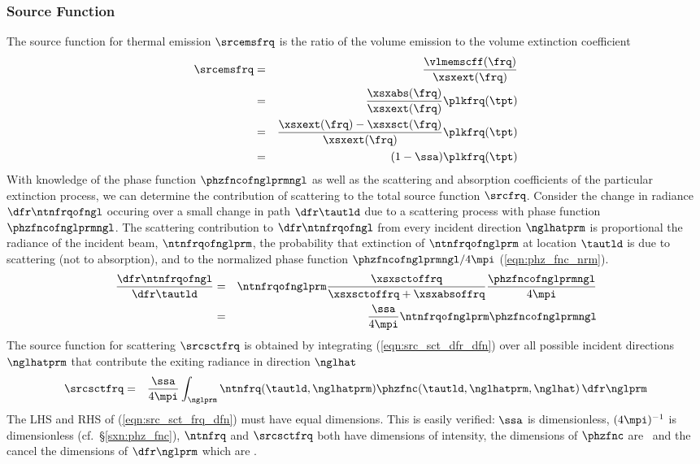 \documentclass[12pt]{article}
\begin{document}
\subsubsection[Source Function]{Source Function}\label{sxn:src_slb}
The source function for thermal emission $\srcemsfrq$ is the ratio of the 
volume emission to the volume extinction coefficient
\begin{eqnarray}
\srcemsfrq & = & \frac{\vlmemscff(\frq)}{\xsxext(\frq)} \nonumber \\
& = & \frac{\xsxabs(\frq)}{\xsxext(\frq)}\plkfrq(\tpt) \nonumber \\
& = & \frac{\xsxext(\frq)-\xsxsct(\frq)}{\xsxext(\frq)}\plkfrq(\tpt) \nonumber \\
& = & (1-\ssa)\plkfrq(\tpt)
\label{eqn:src_ems_frq_dfn}
\end{eqnarray}
With knowledge of the phase function $\phzfncofnglprmngl$ as well as
the scattering and absorption coefficients of the particular
extinction process, we can determine the contribution of scattering
to the total source function $\srcfrq$.
Consider the change in radiance $\dfr\ntnfrqofngl$ occuring over a
small change in path $\dfr\tautld$ due to a scattering process with
phase function $\phzfncofnglprmngl$.
The scattering contribution to $\dfr\ntnfrqofngl$ from every incident 
direction $\nglhatprm$ is proportional the radiance of the incident
beam, $\ntnfrqofnglprm$, the probability that extinction of
$\ntnfrqofnglprm$ at location $\tautld$ is due to scattering (not to
absorption), and to the normalized phase function
$\phzfncofnglprmngl/4\mpi$ (\ref{eqn:phz_fnc_nrm}). 
\begin{eqnarray}
\frac{\dfr \ntnfrqofngl}{\dfr\tautld} & = & 
\ntnfrqofnglprm \frac{\xsxsctoffrq}{\xsxsctoffrq + \xsxabsoffrq} 
\frac{\phzfncofnglprmngl}{4\mpi} \nonumber \\
& = & 
\frac{\ssa}{4\mpi} \ntnfrqofnglprm \phzfncofnglprmngl
\label{eqn:src_sct_dfr_dfn}
\end{eqnarray}
The source function for scattering $\srcsctfrq$ is obtained by
integrating (\ref{eqn:src_sct_dfr_dfn}) over all possible incident 
directions $\nglhatprm$ that contribute the exiting radiance in 
direction $\nglhat$
\begin{eqnarray}
\srcsctfrq & = & \frac{\ssa}{4\mpi} 
\int_{\nglprm} \ntnfrq(\tautld,\nglhatprm)
 \phzfnc(\tautld,\nglhatprm,\nglhat) \,\dfr\nglprm
\label{eqn:src_sct_frq_dfn}
\end{eqnarray}
The LHS and RHS of (\ref{eqn:src_sct_frq_dfn}) must have equal
dimensions. 
This is easily verified: $\ssa$ is dimensionless, $(4\mpi)^{-1}$ is
dimensionless (cf.~\S\ref{sxn:phz_fnc}), $\ntnfrq$ and $\srcsctfrq$
both have dimensions of intensity, the dimensions of $\phzfnc$ are
\xsr\ and the cancel the dimensions of $\dfr\nglprm$ which are \sr. 
\end{document}
